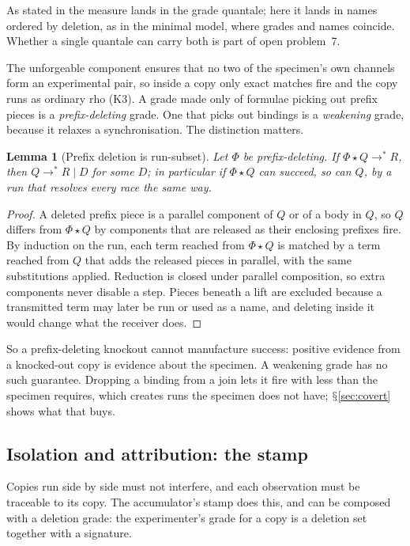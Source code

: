 \documentclass[11pt]{article}
\theoremstyle{definition}
\theoremstyle{plain}
\newtheorem{lemma}[definition]{Lemma}
\theoremstyle{remark}
\DeclareRobustCommand{\S}{\ifmmode\mathsection\else$\mathsection$\fi}
\newcommand{\act}{\mathbin{\star}}
\begin{document}
\noindent
As stated in \cite{FuzzyRho} the measure lands in the grade quantale;
here it lands in names ordered by deletion, as in the minimal model, where
grades and names coincide. Whether a single quantale can carry both is
part of open problem~7.

The unforgeable component ensures that no two of the specimen's own
channels form an experimental pair, so inside a copy only exact matches
fire and the copy runs as ordinary rho (K3). A grade made only of formulae
picking out prefix pieces is a \emph{prefix-deleting} grade. One that
picks out bindings is a \emph{weakening} grade, because it relaxes a
synchronisation. The distinction matters.

\begin{lemma}[Prefix deletion is run-subset]\label{lem:runsubset}
Let $\Phi$ be prefix-deleting. If $\Phi \act Q \to^* R$, then $Q \to^* R
\mid D$ for some $D$; in particular if $\Phi \act Q$ can succeed, so can
$Q$, by a run that resolves every race the same way.
\end{lemma}

\begin{proof}
A deleted prefix piece is a parallel component of $Q$ or of a body in
$Q$, so $Q$ differs from $\Phi \act Q$ by components that are released
as their enclosing prefixes fire. By induction on the run, each term
reached from $\Phi \act Q$ is matched by a term reached from $Q$ that adds
the released pieces in parallel, with the same substitutions applied.
Reduction is closed under parallel composition, so extra components never
disable a step. Pieces beneath a lift are excluded because a transmitted
term may later be run or used as a name, and deleting inside it would
change what the receiver does.
\end{proof}

\noindent
So a prefix-deleting knockout cannot manufacture success: positive
evidence from a knocked-out copy is evidence about the specimen. A
weakening grade has no such guarantee. Dropping a binding from a join lets
it fire with less than the specimen requires, which creates runs the
specimen does not have; \S\ref{sec:covert} shows what that buys.

\subsection{Isolation and attribution: the stamp}

Copies run side by side must not interfere, and each observation must be
traceable to its copy. The accumulator's stamp does this, and can be
composed with a deletion grade: the experimenter's grade for a copy is a
deletion set together with a signature.
\end{document}
